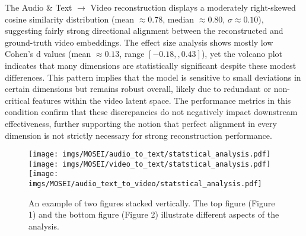 The Audio & Text $\rightarrow$ Video reconstruction displays a moderately right-skewed cosine similarity distribution (mean $\approx 0.78$, median $\approx 0.80$, $\sigma \approx 0.10$), suggesting fairly strong directional alignment between the reconstructed and ground-truth video embeddings. The effect size analysis shows mostly low Cohen’s d values (mean $\approx 0.13$, range $[-0.18,,0.43]$), yet the volcano plot indicates that many dimensions are statistically significant despite these modest differences. This pattern implies that the model is sensitive to small deviations in certain dimensions but remains robust overall, likely due to redundant or non-critical features within the video latent space. The performance metrics in this condition confirm that these discrepancies do not negatively impact downstream effectiveness, further supporting the notion that perfect alignment in every dimension is not strictly necessary for strong reconstruction performance.

\begin{figure}[ht!]
    \centering
    \texttt{[image: imgs/MOSEI/audio\_to\_text/statstical\_analysis.pdf]}
    \texttt{[image: imgs/MOSEI/video\_to\_text/statstical\_analysis.pdf]}
    \texttt{[image: imgs/MOSEI/audio\_text\_to\_video/statstical\_analysis.pdf]}
    \caption{An example of two figures stacked vertically. The top figure (Figure 1) and the bottom figure (Figure 2) illustrate different aspects of the analysis.}
    \label{fig:mosei_stats}
\end{figure}
